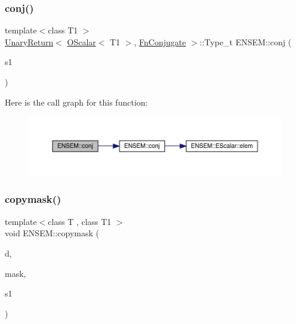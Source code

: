 \subsubsection{\texorpdfstring{conj()}{conj()}}
{\footnotesize\ttfamily template$<$class T1 $>$ \\
\mbox{\hyperlink{structENSEM_1_1UnaryReturn}{Unary\+Return}}$<$ \mbox{\hyperlink{classENSEM_1_1OScalar}{O\+Scalar}}$<$ T1 $>$, \mbox{\hyperlink{structENSEM_1_1FnConjugate}{Fn\+Conjugate}} $>$\+::Type\+\_\+t E\+N\+S\+E\+M\+::conj (\begin{DoxyParamCaption}\item[{const \mbox{\hyperlink{classENSEM_1_1OScalar}{O\+Scalar}}$<$ T1 $>$ \&}]{s1 }\end{DoxyParamCaption})\hspace{0.3cm}{\ttfamily [inline]}}

Here is the call graph for this function\+:\nopagebreak
\begin{figure}[H]
\begin{center}
\leavevmode
\includegraphics[width=350pt]{d1/d71/group__obsscalar_gad6c32f4ab79b8017fc993162435d1d72_cgraph}
\end{center}
\end{figure}
\mbox{\label{group__obsscalar_gada3c474cf374d31a9df7c6cba2d608eb}} 
\subsubsection{\texorpdfstring{copymask()}{copymask()}}
{\footnotesize\ttfamily template$<$class T , class T1 $>$ \\
void E\+N\+S\+E\+M\+::copymask (\begin{DoxyParamCaption}\item[{\mbox{\hyperlink{classENSEM_1_1OScalar}{O\+Scalar}}$<$ T $>$ \&}]{d,  }\item[{const \mbox{\hyperlink{classENSEM_1_1OScalar}{O\+Scalar}}$<$ T1 $>$ \&}]{mask,  }\item[{const \mbox{\hyperlink{classENSEM_1_1OScalar}{O\+Scalar}}$<$ T $>$ \&}]{s1 }\end{DoxyParamCaption})\hspace{0.3cm}{\ttfamily [inline]}}



